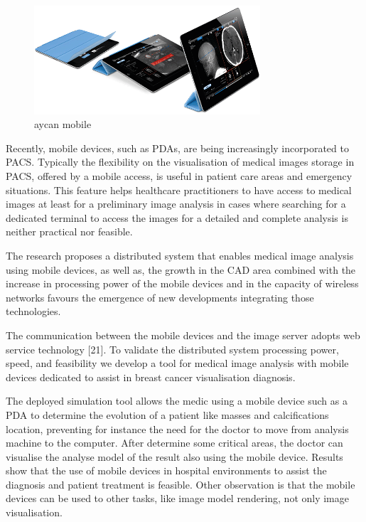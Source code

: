 \begin{figure}[!hbt]
\centering
\includegraphics[width=0.75\textwidth]{mobile.png}
\caption{\label{fig:frog}aycan mobile
}
\end{figure}

Recently, mobile devices, such as PDAs, are being increasingly incorporated to PACS. Typically the flexibility on the visualisation of medical images storage in PACS, offered by a mobile access, is useful in patient care areas and emergency situations. This feature helps healthcare practitioners to have access to medical images at least for a preliminary image analysis in cases where searching for a dedicated terminal to access the images for a detailed and complete analysis is neither practical nor feasible.

The research proposes a distributed system that enables medical image analysis using mobile devices, as well as, the growth in the CAD area combined with the increase in processing power of the mobile devices and in the capacity of wireless networks favours the emergence of new developments integrating those technologies.

The communication between the mobile devices and the image server adopts web service technology [21]. To validate the distributed system processing power, speed, and feasibility we develop a tool for medical image analysis with mobile devices dedicated to assist in breast cancer visualisation diagnosis.

The deployed simulation tool allows the medic using a mobile device such as a PDA to determine the evolution of a patient like masses and calcifications location, preventing for instance the need for the doctor to move from analysis machine to the computer. After determine some critical areas, the doctor can visualise the analyse model of the result also using the mobile device. Results show that the use of mobile devices in hospital environments to assist the diagnosis and patient treatment is feasible. Other observation is that the mobile devices can be used to other tasks, like image model rendering, not only image visualisation.

